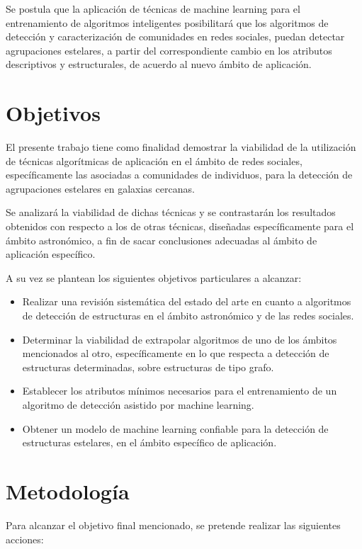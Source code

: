 \documentclass[
	11pt,oneside,a4paper,
	headsepline,footsepline,
	fleqn,
]{memoir}
\begin{document}
Se postula que la aplicación de técnicas de machine learning para el entrenamiento de algoritmos inteligentes posibilitará que los algoritmos de detección y caracterización de comunidades en redes sociales, puedan detectar agrupaciones estelares, a partir del correspondiente cambio en los atributos descriptivos y estructurales, de acuerdo al nuevo ámbito de aplicación.

\section {Objetivos}

El presente trabajo tiene como finalidad demostrar la viabilidad de la utilización de técnicas algorítmicas de aplicación en el ámbito de redes sociales, específicamente las asociadas a comunidades de individuos, para la detección de agrupaciones estelares en galaxias cercanas.

Se analizará la viabilidad de dichas técnicas y se contrastarán los resultados obtenidos con respecto a los de otras técnicas, diseñadas específicamente para el ámbito astronómico, a fin de sacar conclusiones adecuadas al ámbito de aplicación específico.

A su vez se plantean los siguientes objetivos particulares a alcanzar:

\begin{itemize}
	\item Realizar una revisión sistemática del estado del arte en cuanto a algoritmos de detección de estructuras en el ámbito astronómico y de las redes sociales.
	\item Determinar la viabilidad de extrapolar algoritmos de uno de los ámbitos mencionados al otro, específicamente en lo que respecta a detección de estructuras determinadas, sobre estructuras de tipo grafo.
	\item Establecer los atributos mínimos necesarios para el entrenamiento de un algoritmo de detección asistido por machine learning.
	\item Obtener un modelo de machine learning confiable para la detección de estructuras estelares, en el ámbito específico de aplicación.
\end{itemize}

\section {Metodología}

Para alcanzar el objetivo final mencionado, se pretende realizar las siguientes acciones:
\end{document}
